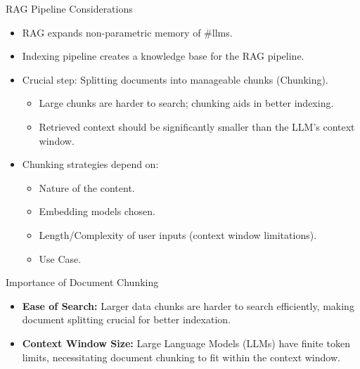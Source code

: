 \begin{frame}[fragile]{RAG Pipeline Considerations}
    \begin{itemize}
        \item RAG expands non-parametric memory of \#llms.
        \item Indexing pipeline creates a knowledge base for the RAG pipeline.
        \item Crucial step: Splitting documents into manageable chunks (Chunking).
            \begin{itemize}
                \item Large chunks are harder to search; chunking aids in better indexing.
                \item Retrieved context should be significantly smaller than the LLM's context window.
            \end{itemize}
        \item Chunking strategies depend on:
            \begin{itemize}
                \item Nature of the content.
                \item Embedding models chosen.
                \item Length/Complexity of user inputs (context window limitations).
                \item Use Case.
            \end{itemize}
    \end{itemize}
\end{frame}

\begin{frame}[fragile]{Importance of Document Chunking}
  \begin{itemize}
    \item \textbf{Ease of Search:} Larger data chunks are harder to search efficiently, making document splitting crucial for better indexation.
    \item \textbf{Context Window Size:} Large Language Models (LLMs) have finite token limits, necessitating document chunking to fit within the context window.
  \end{itemize}
\end{frame}


